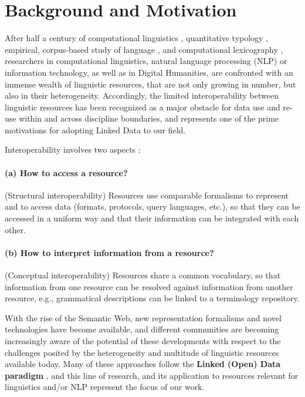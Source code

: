 \section{Background and Motivation}
\label{sec-background}

After
half a century of computational linguistics \citep{dostert1955georgetown},               %
quantitative typology \citep{greenberg60-quant},
empirical, corpus-based study of language \citep{francis-kucera1964},  and %
computational lexicography \citep{morris1969},
researchers in computational linguistics, natural language processing (NLP) or information technology, as well as in Digital Humanities,
 are confronted with an immense wealth of linguistic resources, that are not only growing in number, but also in their heterogeneity.
Accordingly, the limited interoperability between linguistic resources has been recognized as a major obstacle for data use and 
re-use within and across discipline boundaries, and represents one of the prime motivations for adopting Linked Data to our field. 
 
Interoperability involves two aspects \citep{ide-pustejovsky2010-interoperability}:

\smallskip
\noindent
\paragraph{(a) How to access a resource?} (Structural interoperability)
Resources use comparable formalisms to represent and to access data (formats, protocols, query languages, etc.), so that they can be accessed in a uniform way and that their information can be integrated with each other.

\smallskip
\noindent
\paragraph{(b) How to interpret information from a resource?} ({Conceptual} interoperability)
Resources share a common vocabulary, so that information from one resource can be resolved against information from another resource, e.g., grammatical descriptions can be linked to a terminology repository.

\bigskip

\noindent With the rise of the Semantic Web, new representation formalisms and novel technologies have become available, and different communities are becoming increasingly aware of the potential of these developments with respect to the challenges posited by the heterogeneity and multitude of linguistic resources available today. Many of these approaches follow the \textbf{Linked (Open) Data paradigm} \citep{bernersLee2006_linkeddata}, and this line of research, and its application to resources relevant for linguistics and/or NLP represent the focus of our work.

